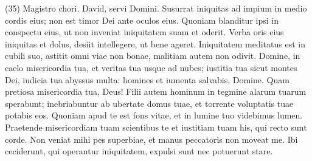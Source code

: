 \begin{biblechapter}  (35) 
\verse  Magistro chori. David, servi Domini. 
\verse Susurrat iniquitas ad impium in medio cordis eius; non est timor Dei ante oculos eius. 
\verse Quoniam blanditur ipsi in conspectu eius, ut non inveniat iniquitatem suam et oderit. 
\verse Verba oris eius iniquitas et dolus, desiit intellegere, ut bene ageret. 
\verse Iniquitatem meditatus est in cubili suo, astitit omni viae non bonae, malitiam autem non odivit. 
\verse Domine, in caelo misericordia tua, et veritas tua usque ad nubes; 
\verse iustitia tua sicut montes Dei, iudicia tua abyssus multa: homines et iumenta salvabis, Domine. 
\verse Quam pretiosa misericordia tua, Deus! Filii autem hominum in tegmine alarum tuarum sperabunt; 
\verse inebriabuntur ab ubertate domus tuae, et torrente voluptatis tuae potabis eos. 
\verse Quoniam apud te est fons vitae, et in lumine tuo videbimus lumen. 
\verse Praetende misericordiam tuam scientibus te et iustitiam tuam his, qui recto sunt corde. 
\verse Non veniat mihi pes superbiae, et manus peccatoris non moveat me. 
\verse Ibi ceciderunt, qui operantur iniquitatem, expulsi sunt nec potuerunt stare. 
\end{biblechapter}

